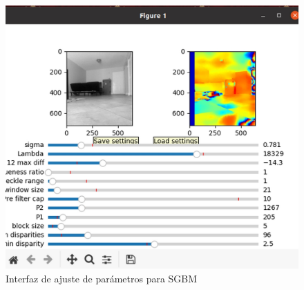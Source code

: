 \begin{figure}[H]
    \centering
    \includegraphics[scale=0.5]{Recursos/tuner_interface.jpg}
    \caption{Interfaz de ajuste de parámetros para SGBM}
    \label{tuner}
\end{figure}